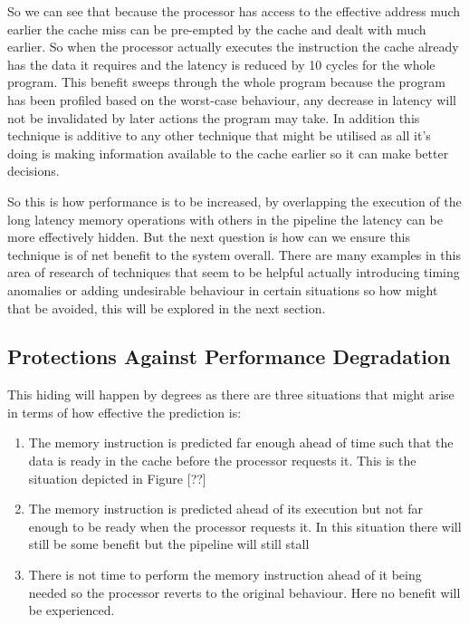 
So we can see that because the processor has access to the effective address much earlier the cache miss can be pre-empted by the cache and dealt with much earlier. So when the processor actually executes the instruction the cache already has the data it requires and the latency is reduced by 10 cycles for the whole program. This benefit sweeps through the whole program because the program has been profiled based on the worst-case behaviour, any decrease in latency will not be invalidated by later actions the program may take. In addition this technique is additive to any other technique that might be utilised as all it's doing is making information available to the cache earlier so it can make better decisions. 

So this is how performance is to be increased, by overlapping the execution of the long latency memory operations with others in the pipeline the latency can be more effectively hidden. But the next question is how can we ensure this technique is of net benefit to the system overall. There are many examples in this area of research of techniques that seem to be helpful actually introducing timing anomalies or adding undesirable behaviour in certain situations so how might that be avoided, this will be explored in the next section.

\subsection{Protections Against Performance Degradation}

This hiding will happen by degrees as there are three situations that might arise in terms of how effective the prediction is:

\begin{enumerate}[label=\textbf{Situation \arabic*}]
	\item The memory instruction is predicted far enough ahead of time such that the data is ready in the cache before the processor requests it. This is the situation depicted in Figure [??]
	\item The memory instruction is predicted ahead of its execution but not far enough to be ready when the processor requests it. In this situation there will still be some benefit but the pipeline will still stall
	\item There is not time to perform the memory instruction ahead of it being needed so the processor reverts to the original behaviour. Here no benefit will be experienced.
\end{enumerate}


